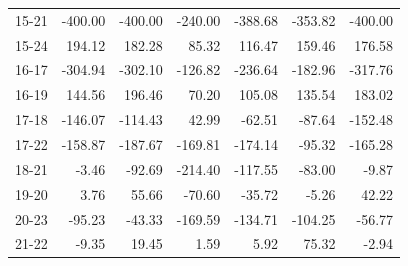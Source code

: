 \begin{tabular}{lrrrrrr}
15-21 & -400.00 & -400.00 & -240.00 & -388.68 & -353.82 & -400.00 \\
15-24 & 194.12 & 182.28 & 85.32 & 116.47 & 159.46 & 176.58 \\
16-17 & -304.94 & -302.10 & -126.82 & -236.64 & -182.96 & -317.76 \\
16-19 & 144.56 & 196.46 & 70.20 & 105.08 & 135.54 & 183.02 \\
17-18 & -146.07 & -114.43 & 42.99 & -62.51 & -87.64 & -152.48 \\
17-22 & -158.87 & -187.67 & -169.81 & -174.14 & -95.32 & -165.28 \\
18-21 & -3.46 & -92.69 & -214.40 & -117.55 & -83.00 & -9.87 \\
19-20 & 3.76 & 55.66 & -70.60 & -35.72 & -5.26 & 42.22 \\
20-23 & -95.23 & -43.33 & -169.59 & -134.71 & -104.25 & -56.77 \\
21-22 & -9.35 & 19.45 & 1.59 & 5.92 & 75.32 & -2.94 \\
\bottomrule
\end{tabular}
